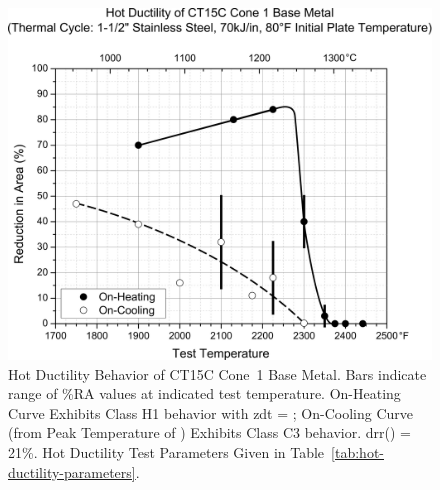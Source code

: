 {\begin{figure}[h!]
    \setlength{\abovecaptionskip}{15pt}
    \centering
    \includegraphics[width=6in]{figures/hot-ductility/c1-hot-ductility-curve.pdf}
    \caption[Hot Ductility Behavior of Cone~1 Base Metal.]{Hot Ductility Behavior of CT15C Cone~1 Base Metal. Bars indicate range of \%RA values at indicated test temperature. On-Heating Curve Exhibits Class H1 behavior with \gls{zdt} = ; On-Cooling Curve (from Peak Temperature of ) Exhibits Class C3 behavior.  \gls{drr}() = 21\%. Hot Ductility Test Parameters Given in Table~\ref{tab:hot-ductility-parameters}.}
    \label{fig:c1-hot-ductility}
\end{figure}

}
